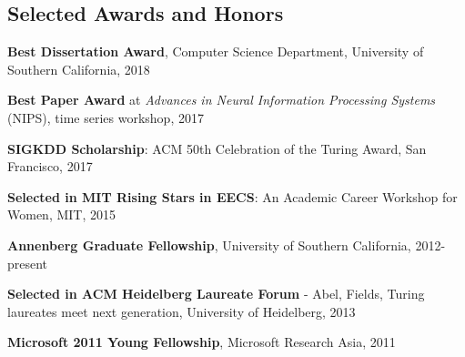 \documentclass[margin,line]{res}
\newenvironment{list1}{
  \begin{list}{\ding{113}}{%
      \setlength{\itemsep}{0in}
      \setlength{\parsep}{0in} \setlength{\parskip}{0in}
      \setlength{\topsep}{0in} \setlength{\partopsep}{0in} 
      \setlength{\leftmargin}{0.17in}}}{\end{list}}
\begin{document}
\begin{resume}


\section{\sc Selected Awards and Honors} 

\textbf{Best Dissertation Award}, Computer Science Department, University of Southern California, 2018

\textbf{Best Paper Award} at \textit{Advances in Neural Information Processing Systems} (NIPS), time series workshop, 2017

\textbf{SIGKDD Scholarship}: ACM 50th Celebration of the Turing Award, San Francisco, 2017

\textbf{Selected in MIT Rising Stars in EECS}: An Academic Career Workshop for Women, MIT, 2015

\textbf{Annenberg Graduate Fellowship}, University of Southern California, 2012-present







%

\textbf{Selected in ACM Heidelberg Laureate Forum }- Abel, Fields, Turing laureates meet next generation, University of Heidelberg, 2013


\textbf{Microsoft 2011 Young Fellowship}, Microsoft Research Asia, 2011



\end{resume}
\end{document}
